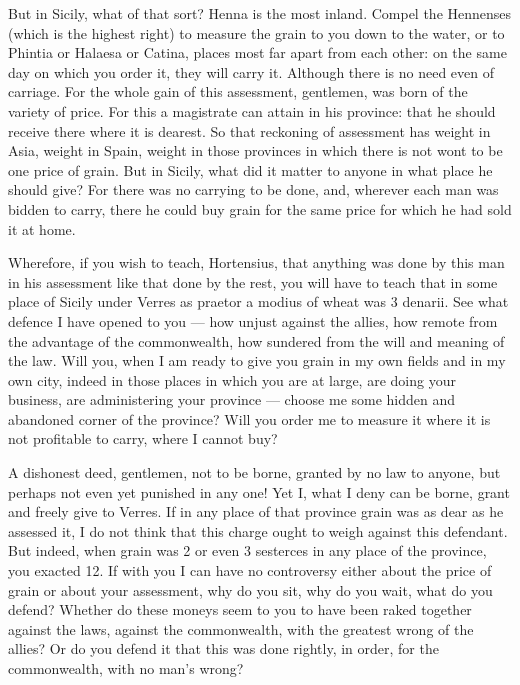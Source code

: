  But in Sicily, what of that sort? Henna is the most inland. Compel the Hennenses (which is the highest right) to measure the grain to you down to the water, or to Phintia or Halaesa or Catina, places most far apart from each other: on the same day on which you order it, they will carry it. Although there is no need even of carriage. For the whole gain of this assessment, gentlemen, was born of the variety of price. For this a magistrate can attain in his province: that he should receive there where it is dearest. So that reckoning of assessment has weight in Asia, weight in Spain, weight in those provinces in which there is not wont to be one price of grain. But in Sicily, what did it matter to anyone in what place he should give? For there was no carrying to be done, and, wherever each man was bidden to carry, there he could buy grain for the same price for which he had sold it at home.

 Wherefore, if you wish to teach, Hortensius, that anything was done by this man in his assessment like that done by the rest, you will have to teach that in some place of Sicily under Verres as praetor a modius of wheat was 3 denarii. See what defence I have opened to you --- how unjust against the allies, how remote from the advantage of the commonwealth, how sundered from the will and meaning of the law. Will you, when I am ready to give you grain in my own fields and in my own city, indeed in those places in which you are at large, are doing your business, are administering your province --- choose me some hidden and abandoned corner of the province? Will you order me to measure it where it is not profitable to carry, where I cannot buy?

 A dishonest deed, gentlemen, not to be borne, granted by no law to anyone, but perhaps not even yet punished in any one! Yet I, what I deny can be borne, grant and freely give to Verres. If in any place of that province grain was as dear as he assessed it, I do not think that this charge ought to weigh against this defendant. But indeed, when grain was 2 or even 3 sesterces in any place of the province, you exacted 12. If with you I can have no controversy either about the price of grain or about your assessment, why do you sit, why do you wait, what do you defend? Whether do these moneys seem to you to have been raked together against the laws, against the commonwealth, with the greatest wrong of the allies? Or do you defend it that this was done rightly, in order, for the commonwealth, with no man's wrong?


